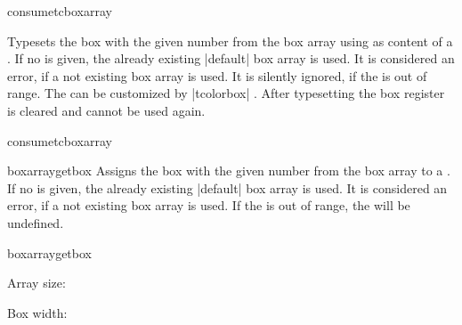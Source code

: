 \begin{docCommand}[doc new=2015-07-13]{consumetcboxarray}{}
\begin{articleside}[before skip=5pt]
  Typesets the box with the given  number from the box array 
  using  as content of a .
  If no  is given, the already existing |default| box array is used.
  It is considered an error, if a not existing box array  is used.
  It is silently ignored, if the  is out of range.
  The  can be customized by |tcolorbox| .
  After typesetting the box register is cleared and cannot be used again.
\tcblower{}
\end{articleside}
\begin{exdispExample}{consumetcboxarray}
\begin{tcolorbox}[enhanced jigsaw,size=fbox,width=6cm,
  colback=yellow!10,colframe=yellow!10!black,
  enforce breakable,%
  break at=5cm,
  watermark text=\arabic{tcbbreakpart},
  reset and store to box array
  ]
\lipsum[1]
\end{tcolorbox}

 \hfill {} \hfill {}
\end{exdispExample}
\end{docCommand}


\begin{docCommand}[doc new=2015-07-13]{boxarraygetbox}{}
  Assigns the box with the given  number from the box array 
  to a .
  If no  is given, the already existing |default| box array is used.
  It is considered an error, if a not existing box array  is used.
  If the  is out of range, the  will be undefined.
\begin{exdispExample}{boxarraygetbox}

\boxarraygetsize{\mysize} Array size: \mysize

Box width: \the\wd\mybox
\quad\usebox{\mybox}
\end{exdispExample}
\end{docCommand}


